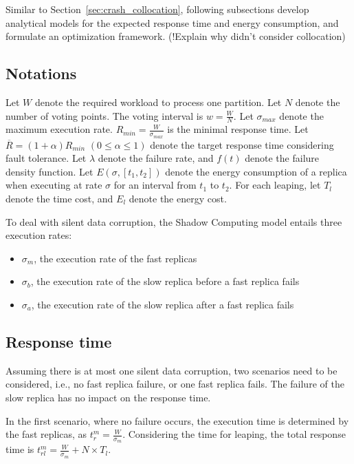 Similar to Section~\ref{sec:crash_collocation}, following subsections develop analytical models for the expected response time and energy consumption, and formulate an optimization framework. (!Explain why didn't consider collocation)

\subsection{Notations}
Let $W$ denote the required workload to process one partition. Let $N$ denote the number of voting points. The voting interval is $w=\frac{W}{N}$. Let $\sigma_{max}$ denote the maximum execution rate. $R_{min}=\frac{W}{\sigma_{max}}$ is the minimal response time. Let $\overline{R}=(1+\alpha)R_{min}$ $(0\leq \alpha \leq 1)$ denote the target response time considering fault tolerance. Let $\lambda$ denote the failure rate, and $f(t)$ denote the failure density function. %
Let $E(\sigma, [t_1, t_2])$ denote the energy consumption of a replica when executing at rate $\sigma$ for an interval from $t_1$ to $t_2$. For each leaping, let $T_l$ denote the time cost, and $E_l$ denote the energy cost.

To deal with silent data corruption, the Shadow Computing model entails three execution rates:
\begin{itemize}
	\item $\sigma_m$, the execution rate of the fast replicas 
    \item $\sigma_b$, the execution rate of the slow replica before a fast replica fails
    \item $\sigma_a$, the execution rate of the slow replica after a fast replica fails
\end{itemize}

\subsection{Response time}
Assuming there is at most one silent data corruption, two scenarios need to be considered, i.e., no fast replica failure, or one fast replica fails. The failure of the slow replica has no impact on the response time. 

In the first scenario, where no failure occurs, the execution time is determined by the fast replicas, as $t_r^m=\frac{W}{\sigma_m}$. Considering the time for leaping, the total response time is $t_{rl}^m=\frac{W}{\sigma_m} + N \times T_l$.

